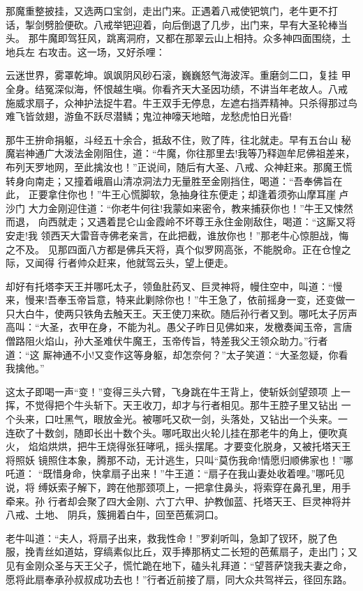 那魔重整披挂，又选两口宝剑，走出门来。正遇着八戒使钯筑门，老牛更不打
话，掣剑劈脸便砍。八戒举钯迎着，向后倒退了几步，出门来，早有大圣轮棒当头。
那牛魔即驾狂风，跳离洞府，又都在那翠云山上相持。众多神四面围绕，土地兵左
右攻击。这一场，又好杀哩：

云迷世界，雾罩乾坤。飒飒阴风砂石滚，巍巍怒气海波浑。重磨剑二口，复挂
甲全身。结冤深似海，怀恨越生嗔。你看齐天大圣因功绩，不讲当年老故人。八戒
施威求扇子，众神护法捉牛君。牛王双手无停息，左遮右挡弄精神。只杀得那过鸟
难飞皆敛翅，游鱼不跃尽潜鳞；鬼泣神嚎天地暗，龙愁虎怕日光昏!

那牛王拚命捐躯，斗经五十余合，抵敌不住，败了阵，往北就走。早有五台山
秘魔岩神通广大泼法金刚阻住，道：“牛魔，你往那里去!我等乃释迦牟尼佛祖差来，
布列天罗地网，至此擒汝也！”正说间，随后有大圣、八戒、众神赶来。那魔王慌
转身向南走；又撞着峨眉山清凉洞法力无量胜至金刚挡住，喝道：“吾奉佛旨在此，
正要拿住你也！”牛王心慌脚软，急抽身往东便走；却逢着须弥山摩耳崖卢沙门
大力金刚迎住道：“你老牛何往!我蒙如来密令，教来捕获你也！”牛王又悚然而退，
向西就走；又遇着昆仑山金霞岭不坏尊王永住金刚敌住，喝道：“这厮又将安走!我
领西天大雷音寺佛老亲言，在此把截，谁放你也！”那老牛心惊胆战，悔之不及。
见那四面八方都是佛兵天将，真个似罗网高张，不能脱命。正在仓惶之际，又闻得
行者帅众赶来，他就驾云头，望上便走。

却好有托塔李天王并哪吒太子，领鱼肚药叉、巨灵神将，幔住空中，叫道：“慢
来，慢来!吾奉玉帝旨意，特来此剿除你也！”牛王急了，依前摇身一变，还变做一
只大白牛，使两只铁角去触天王。天王使刀来砍。随后孙行者又到。哪吒太子厉声
高叫：“大圣，衣甲在身，不能为礼。愚父子昨日见佛如来，发檄奏闻玉帝，言唐
僧路阻火焰山，孙大圣难伏牛魔王，玉帝传旨，特差我父王领众助力。”行者道：“这
厮神通不小!又变作这等身躯，却怎奈何？”太子笑道：“大圣忽疑，你看我擒他。”

这太子即喝一声“变！”变得三头六臂，飞身跳在牛王背上，使斩妖剑望颈项
上一挥，不觉得把个牛头斩下。天王收刀，却才与行者相见。那牛王腔子里又钻出
一个头来，口吐黑气，眼放金光。被哪吒又砍一剑，头落处，又钻出一个头来。一
连砍了十数剑，随即长出十数个头。哪吒取出火轮儿挂在那老牛的角上，便吹真火，
焰焰烘烘，把牛王烧得张狂哮吼，摇头摆尾。才要变化脱身，又被托塔天王将照妖
镜照住本象，腾那不动，无计逃生，只叫“莫伤我命!情愿归顺佛家也！”哪吒道：
“既惜身命，快拿扇子出来！”牛王道：“扇子在我山妻处收着哩。”哪吒见说，将
缚妖索子解下，跨在他那颈项上，一把拿住鼻头，将索穿在鼻孔里，用手牵来。孙
行者却会聚了四大金刚、六丁六甲、护教伽蓝、托塔天王、巨灵神将并八戒、土地、
阴兵，簇拥着白牛，回至芭蕉洞口。

老牛叫道：“夫人，将扇子出来，救我性命！”罗刹听叫，急卸了钗环，脱了色
服，挽青丝如道姑，穿缟素似比丘，双手捧那柄丈二长短的芭蕉扇子，走出门；又
见有金刚众圣与天王父子，慌忙跪在地下，磕头礼拜道：“望菩萨饶我夫妻之命，
愿将此扇奉承孙叔叔成功去也！”行者近前接了扇，同大众共驾祥云，径回东路。

